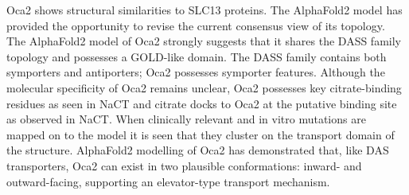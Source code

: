 Oca2 shows structural similarities to SLC13 proteins. The AlphaFold2 model has provided the opportunity to revise the current consensus view of its topology. The AlphaFold2 model of Oca2 strongly suggests that it shares the DASS family topology and possesses a GOLD-like domain.  The DASS family contains both symporters and antiporters; Oca2 possesses symporter features.  Although the molecular specificity of Oca2 remains unclear, Oca2 possesses key citrate-binding residues as seen in NaCT and citrate docks to Oca2 at the putative binding site as observed in NaCT.   When clinically relevant and in vitro mutations are mapped on to the model it is seen that they cluster on the transport domain of the structure.  AlphaFold2 modelling of Oca2 has demonstrated that, like DAS transporters, Oca2 can exist in two plausible conformations: inward- and outward-facing, supporting an elevator-type transport mechanism.













































